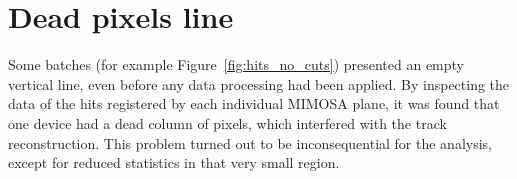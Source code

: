 

\section{Dead pixels line}

Some batches (for example Figure~\ref{fig:hits_no_cuts}) presented an empty vertical line, even before any data processing had been applied. By inspecting the data of the hits registered by each individual MIMOSA plane, it was found that one device had a dead column of pixels, which interfered with the track reconstruction. This problem turned out to be inconsequential for the analysis, except for reduced statistics in that very small region.

